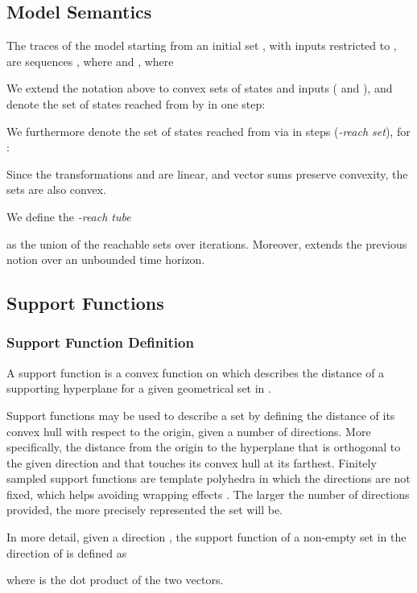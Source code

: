 \documentclass{IEEEtran}
\begin{document}
\subsection{Model Semantics}\label{sec:model_semantics}


The traces of the model starting from an initial set , 
with inputs restricted to , are sequences 
, 
where  and , 
where 


We extend the notation above to convex sets of states and inputs ( and ), 
and denote the set of states reached from  by  in one step:

We furthermore denote the set of states reached from
 via  in  steps (\emph{-reach set}), for :

Since the transformations  and  are linear, and
vector sums preserve convexity, the sets  are also
convex.

We define the \emph{-reach tube} 

as the union of the reachable sets over  iterations.
Moreover,  
extends the previous notion over an 
unbounded time horizon.

\subsection{Support Functions} \label{sec:support}


\subsubsection{Support Function Definition} \label{sec:support_def}


A support function is a convex function on  which describes the distance of a supporting
hyperplane for a given geometrical set in . 

Support functions may be used to describe a set by defining the distance of
its convex hull with respect to the origin, given a number of directions. 
More specifically, the distance from the origin to the hyperplane that is orthogonal to the given
direction and that touches its convex hull at its farthest. Finitely sampled 
support functions are template polyhedra in which the directions are not fixed, 
which helps avoiding wrapping effects \cite{GLM06}.
The larger the number of directions provided, the more precisely represented the set will be. 

In more detail, given a direction ,
the support function of a non-empty set  in the direction of  is defined as 

where  is the dot product of the two vectors.
\end{document}
